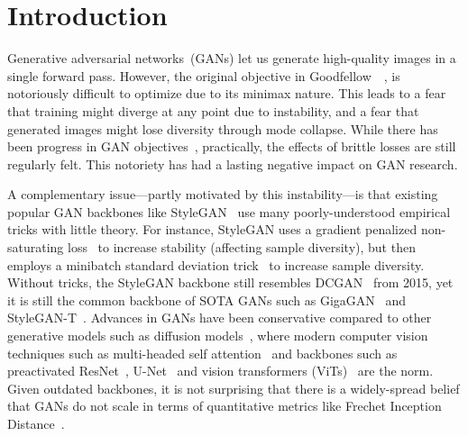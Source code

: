 \section{Introduction}
\label{sec:intro}
Generative adversarial networks~(GANs) let us generate high-quality images in a single forward pass. 
However, the original objective in Goodfellow~\etal~\cite{gan}, is notoriously difficult to optimize due to its minimax nature. This leads to a fear that training might diverge at any point due to instability, and a fear that generated images might lose diversity through mode collapse. While there has been progress in GAN objectives~\cite{wgan-gp,rgan,rpgan,r1,r1r2}, practically, the effects of brittle losses are still regularly felt. This notoriety has had a lasting negative impact on GAN research.

A complementary issue---partly motivated by this instability---is that existing popular GAN backbones like StyleGAN~\cite{sg1,sg2,sg2ada,sg3} use many poorly-understood empirical tricks with little theory. 
For instance, StyleGAN uses a gradient penalized non-saturating loss~\cite{r1} to increase stability (affecting sample diversity), but then employs a minibatch standard deviation trick~\cite{pggan} to increase sample diversity.
Without tricks, the StyleGAN backbone still resembles DCGAN~\cite{dcgan} from 2015, yet it is still the common backbone of SOTA GANs such as GigaGAN~\cite{gigagan} and StyleGAN-T~\cite{sg-t}.
Advances in GANs have been conservative compared to other generative models such as diffusion models~\cite{ddpm,sde,edm,edm2}, where modern computer vision techniques such as multi-headed self attention~\cite{trans} and backbones such as preactivated ResNet~\cite{resnet2}, U-Net~\cite{unet} and vision transformers (ViTs)~\cite{vit} are the norm. 
Given outdated backbones, it is not surprising that there is a widely-spread belief that GANs do not scale in terms of quantitative metrics like Frechet Inception Distance~\cite{fid}. 

